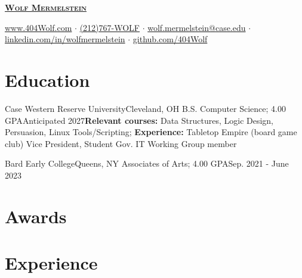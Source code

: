 \documentclass[letterpaper, 10pt]{article}
\begin{document}
	
	
	\begin{center}
		\textbf{\Huge \scshape \href{https://404wolf.com}{Wolf Mermelstein}} \\ \vspace{6pt}
		
		\href{https://404wolf.com}{www.404Wolf.com}
		$\cdot$
		\small \href{tel:(+12127679653)}{(212)767-WOLF}
		$\cdot$
		\href{mailto:wolf.mermelstein@case.edu}{wolf.mermelstein@case.edu}
		$\cdot$
		\href{https://linkedin.com/in/wolfmermelstein}{linkedin.com/in/wolfmermelstein}
		$\cdot$
		\href{https://github.com/404wolf}{github.com/404Wolf}
	\end{center}
	\vspace{-14px}
	
	\section{Education}
	\resumeSubHeadingListStart
	   \resumeSubHeading
	   {Case Western Reserve University}{Cleveland, OH}{}
	   {B.S. Computer Science; 4.00 GPA}{Anticipated 2027}{\textbf{Relevant courses:} Data Structures, Logic Design, Persuasion, Linux Tools/Scripting; \textbf{Experience:} Tabletop Empire (board game club) Vice President, Student Gov. IT Working Group member}

	   \resumeSubheading
	   {Bard Early College}{Queens, NY}{}
	   {Associates of Arts;  4.00 GPA}{Sep. 2021 - June 2023}{}
	\resumeSubHeadingListEnd
	
	\section{Awards}
	\resumeSubHeadingListStart
	
	
	
		
	\resumeSubHeadingListEnd
	
	\section{Experience}
	\resumeSubHeadingListStart
	
\end{document}
